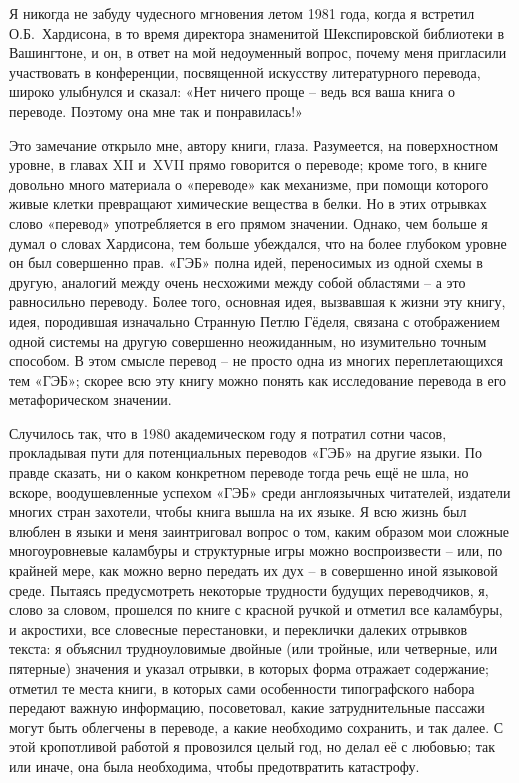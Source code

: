 \documentclass[../main.tex]{subfiles}
\begin{document}
Я никогда не забуду чудесного мгновения летом 1981 года, когда я встретил О.Б.~Хардисона, в то время директора знаменитой Шекспировской библиотеки в Вашингтоне, и он, в ответ на мой недоуменный вопрос, почему меня пригласили участвовать в конференции, посвященной искусству литературного перевода, широко улыбнулся и сказал: «Нет ничего проще \--- ведь вся ваша книга о переводе. Поэтому она мне так и понравилась!»

Это замечание открыло мне, автору книги, глаза. Разумеется, на поверхностном уровне, в главах XII и~XVII прямо говорится о переводе; кроме того, в книге довольно много материала о «переводе» как механизме, при помощи которого живые клетки превращают химические вещества в белки. Но в этих отрывках слово «перевод» употребляется в его прямом значении. Однако, чем больше я думал о словах Хардисона, тем больше убеждался, что на более глубоком уровне он был совершенно прав. «ГЭБ» полна идей, переносимых из одной схемы в другую, аналогий между очень несхожими между собой областями \--- а это равносильно переводу. Более того, основная идея, вызвавшая к жизни эту книгу, идея, породившая изначально Странную Петлю Гёделя, связана с отображением одной системы на другую совершенно неожиданным, но изумительно точным способом. В этом смысле перевод \--- не просто одна из многих переплетающихся тем «ГЭБ»; скорее всю эту книгу можно понять как исследование перевода в его метафорическом значении.

Случилось так, что в 1980 академическом году я потратил сотни часов, прокладывая пути для потенциальных переводов «ГЭБ» на другие языки. По правде сказать, ни о каком конкретном переводе тогда речь ещё не шла, но вскоре, воодушевленные успехом «ГЭБ» среди англоязычных читателей, издатели многих стран захотели, чтобы книга вышла на их языке. Я всю жизнь был влюблен в языки и меня заинтриговал вопрос о том, каким образом мои сложные многоуровневые каламбуры и структурные игры можно воспроизвести \--- или, по крайней мере, как можно верно передать их дух \--- в совершенно иной языковой среде. Пытаясь предусмотреть некоторые трудности будущих переводчиков, я, слово за словом, прошелся по книге с красной ручкой и отметил все каламбуры, и акростихи, все словесные перестановки, и переклички далеких отрывков текста: я объяснил трудноуловимые двойные (или тройные, или четверные, или пятерные) значения и указал отрывки, в которых форма отражает содержание; отметил те места книги, в которых сами особенности типографского набора передают важную информацию, посоветовал, какие затруднительные пассажи могут быть облегчены в переводе, а какие необходимо сохранить, и так далее. С этой кропотливой работой я провозился целый год, но делал её с любовью; так или иначе, она была необходима, чтобы предотвратить катастрофу.
\end{document}
